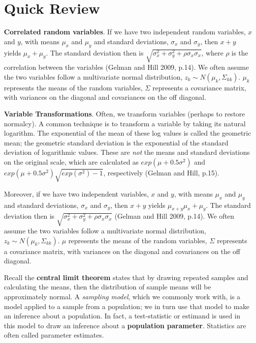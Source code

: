 \documentclass[
]{book}
\begin{document}
\section{Quick Review}\label{quick-review}

\textbf{Correlated random variables}. If we have two independent random variables, \(x\) and \(y\), with means \(\mu_x\) and \(\mu_y\) and standard deviations, \(\sigma_x\) and \(\sigma_y\), then \(x+y\) yields \(\mu_x+\mu_y\). The standard deviation then is \(\sqrt{\sigma^2_x+\sigma^2_y+\rho\sigma_x\sigma_x}\), where \(\rho\) is the correlation between the variables (Gelman and Hill 2009, p.14). We often assume the two variables follow a multivariate normal distribution, \(z_k \sim N(\mu_k, \Sigma_{kk})\). \(\mu_k\) represents the means of the random variables, \(\Sigma\) represents a covariance matrix, with variances on the diagonal and covariances on the off diagonal.

\textbf{Variable Transformations}. Often, we transform variables (perhaps to restore normalcy). A common technique is to transform a variable by taking its natural logarithm. The exponential of the mean of these log values is called the geometric mean; the geometric standard deviation is the exponential of the standard deviation of logarithmic values. These are \emph{not} the means and standard deviations on the original scale, which are calculated as \(exp(\mu+0.5 \sigma^2)\) and \(exp(\mu+0.5 \sigma^2)\sqrt{exp(\sigma^2)-1}\), respectively (Gelman and Hill, p.15).

Moreover, if we have two independent variables, \(x\) and \(y\), with means \(\mu_x\) and \(\mu_y\) and standard deviations, \(\sigma_x\) and \(\sigma_y\), then \(x+y\) yields \(\mu_{x+y}\mu_x+\mu_y\). The standard deviation then is \(\sqrt{\sigma^2_x+\sigma^2_y+\rho\sigma_x\sigma_x}\) (Gelman and Hill 2009, p.14). We often assume the two variables follow a multivariate normal distribution, \(z_k \sim N(\mu_k, \Sigma_{kk})\). \(\mu\) represents the means of the random variables, \(\Sigma\) represents a covariance matrix, with variances on the diagonal and covariances on the off diagonal.

Recall the \textbf{central limit theorem} states that by drawing repeated samples and calculating the means, then the distribution of sample means will be approximately normal. A \emph{sampling model}, which we commonly work with, is a model applied to a sample from a population; we in turn use that model to make an inference about a population. In fact, a test-statistic or estimand is used in this model to draw an inference about a \textbf{population parameter}. Statistics are often called parameter estimates.
\end{document}
